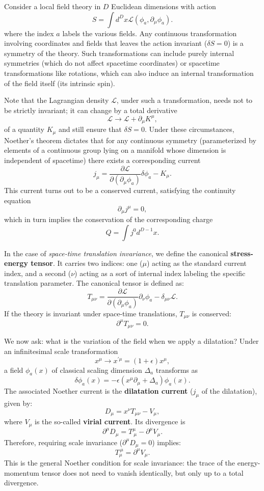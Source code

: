 Consider a local field theory in \(D\) Euclidean dimensions with action
\[
    S=\int d^{D}x\mathcal{L}(\phi_{a},\partial_{\mu}\phi_{a}).
\]
where the index \(a\) labels the various fields. Any continuous transformation involving coordinates and fields that leaves the action invariant (\(\delta S=0\)) is a symmetry of the theory. Such transformations can include purely internal symmetries (which do not affect spacetime coordinates) or spacetime transformations like rotations, which can also induce an internal transformation of the field itself (its intrinsic spin).

Note that the Lagrangian density \(\mathcal{L}\), under such a transformation, needs not to be strictly invariant; it can change by a total derivative
\[
    \mathcal{L}\rightarrow\mathcal{L}+\partial_{\mu}K^{\mu},
\]
of a quantity \(K_{\mu}\) and still ensure that \(\delta S=0\). Under these circumstances, Noether's theorem dictates that for any continuous symmetry (parameterized by elements of a continuous group lying on a manifold whose dimension is independent of spacetime) there exists a corresponding current
\[
    j_{\mu}=\frac{\partial\mathcal{L}}{\partial(\partial_{\mu}\phi_{a})}\delta\phi_{a}-K_{\mu}.
\]
This current turns out to be a conserved current, satisfying the continuity equation
\[
    \partial_{\mu}j^{\mu}=0,
\]
which in turn implies the conservation of the corresponding charge
\[
    Q=\int j^{0}d^{D-1}x.
\]

In the case of \textit{space-time translation invariance}, we define the canonical \textbf{stress-energy tensor}. It carries two indices: one (\(\mu\)) acting as the standard current index, and a second (\(\nu\)) acting as a sort of internal index labeling the specific translation parameter. The canonical tensor is defined as:
\[
    T_{\mu\nu}=\frac{\partial\mathcal{L}}{\partial(\partial_{\mu}\phi_{a})}\partial_{\nu}\phi_{a}-\delta_{\mu\nu}\mathcal{L}.
\]
If the theory is invariant under space-time translations, \(T_{\mu\nu}\) is conserved:
\[
    \partial^{\mu}T_{\mu\nu}=0.
\]

We now ask: what is the variation of the field when we apply a dilatation? Under an infinitesimal scale transformation
\[
    x^{\mu}\rightarrow x^{\prime\mu}=(1+\epsilon)x^{\mu},
\]
a field \(\phi_{a}(x)\) of classical scaling dimension \(\Delta_{a}\) transforms as
\[
    \delta\phi_{a}(x)=-\epsilon(x^{\mu}\partial_{\mu}+\Delta_{a})\phi_{a}(x).
\]
The associated Noether current is the \textbf{dilatation current} (\(j_{\mu}\) of the dilatation), given by:
\[
    D_{\mu}=x^{\nu}T_{\mu\nu}-V_{\mu},
\]
where \(V_{\mu}\) is the so-called \textbf{virial current}. Its divergence is
\[
    \partial^{\mu}D_{\mu}=T_{\ \mu}^{\mu}-\partial^{\mu}V_{\mu}.
\]
Therefore, requiring scale invariance (\(\partial^{\mu}D_{\mu} = 0\)) implies:
\begin{equation}
    T_{\mu}^{\ \mu}=\partial^{\mu}V_{\mu}.
    \label{eq:trace_virial}
\end{equation}
This is the general Noether condition for scale invariance: the trace of the energy-momentum tensor does not need to vanish identically, but only up to a total divergence.

